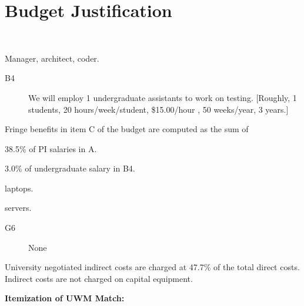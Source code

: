 \documentclass[11pt]{NSF}
\begin{document}
\section{Budget Justification}

 \\
\noindent

Manager, architect, coder.


\begin{description}

\item[B4] We will employ 1 undergraduate assistants to work on testing.  
[Roughly, 1 students, 20 hours/week/student, \$15.00/hour , 50 weeks/year, 3 years.]
\end{description}


\noindent
Fringe benefits in item C of the budget are computed as the sum of
\begin{list}{}{\leftmargin=3.2em\itemsep=5pt\topsep=10pt\parsep=0pt}
\item[1.] 38.5\% of PI salaries in A.
\item[3.] 3.0\%  of undergraduate salary  in B4.
\end{list}


\begin{list}{}{\leftmargin=3.2em\itemsep=5pt\topsep=10pt\parsep=0pt}
\item[N.] laptops.
\item[M.] servers.
\end{list}
\noindent

\medskip


\begin{description}
\item[G6] 
None
\end{description}

University negotiated indirect costs are charged at 47.7\% of the total direct
costs.  Indirect costs are not charged on capital equipment.


\noindent
{\bf {Itemization of UWM Match:}} \\
\end{document}
